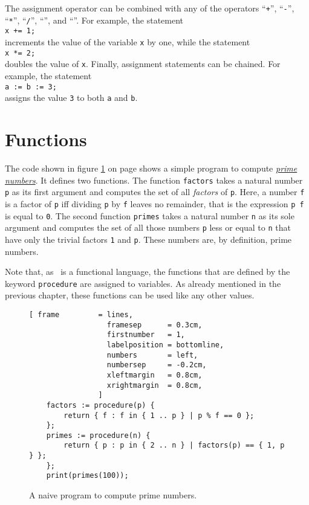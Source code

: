 The assignment operator can be combined with any of the operators 
``\texttt{+}'',
``\texttt{-}'',
``\texttt{*}'',
``\texttt{/}'',
``\texttt{}'', and 
``\texttt{}''.
For example, the statement
\\[0.2cm]
\hspace*{1.3cm}
\texttt{x += 1;}
\\[0.2cm]
increments the value of the variable \texttt{x} by one,  while the statement
\\[0.2cm]
\hspace*{1.3cm}
\texttt{x *= 2;}
\\[0.2cm]
doubles the value of \texttt{x}.   Finally,
assignment statements can be chained.  For example, the statement
\\[0.2cm]
\hspace*{1.3cm}
\texttt{a := b := 3;}
\\[0.2cm]
assigns the value \texttt{3} to both  \texttt{a} and \texttt{b}.

\section{Functions}
The code shown in figure
\ref{fig:primes-slim.stlx} on page \pageref{fig:primes-slim.stlx} shows a simple program
to compute \href{http://en.wikipedia.org/wiki/Prime_number}{\emph{prime numbers}}.  
It defines two functions.  The function \texttt{factors} takes a
natural number \texttt{p} as its first argument and computes the set of all \emph{factors} of \texttt{p}.  Here, a number
\texttt{f} is a factor of \texttt{p} iff dividing \texttt{p} by \texttt{f} leaves no remainder, that is 
the expression \texttt{p  f} is equal to \texttt{0}.
The second function \texttt{primes} takes a natural number \texttt{n} as its sole argument and computes the
set of all those numbers \texttt{p} less or equal to \texttt{n} that have only the trivial factors
\texttt{1} and \texttt{p}.  These numbers are, by definition, prime numbers.

Note that, as \setlx\ is a functional language, the functions that are defined by the
keyword \texttt{procedure} are assigned to variables.  As already mentioned in the previous chapter,
these functions can be used like any other values.

\begin{figure}[!ht]
\centering
\begin{Verbatim}[ frame         = lines, 
                  framesep      = 0.3cm, 
                  firstnumber   = 1,
                  labelposition = bottomline,
                  numbers       = left,
                  numbersep     = -0.2cm,
                  xleftmargin   = 0.8cm,
                  xrightmargin  = 0.8cm,
                ]
    factors := procedure(p) {
        return { f : f in { 1 .. p } | p % f == 0 };
    };
    primes := procedure(n) {
        return { p : p in { 2 .. n } | factors(p) == { 1, p } };
    };
    print(primes(100));
\end{Verbatim}
\vspace*{-0.3cm}
\caption{A naive program to compute prime numbers.}
\label{fig:primes-slim.stlx}
\end{figure}

